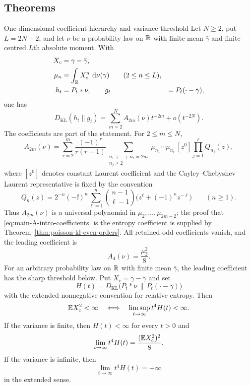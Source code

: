 \subsection*{Theorems}\label{subsec:main-results}

\begin{maintheorem}{One-dimensional coefficient hierarchy and variance threshold}
\label{thm:main-A}
Let \(N\ge2\), put \(L=2N-2\), and let \(\nu\) be a probability law on
\(\mathbb{R}\) with finite mean \(\bar{\gamma}\) and finite centred \(L\)th absolute
moment.  With
\[
\begin{aligned}
  X_c&=\gamma-\bar{\gamma},\\
  \mu_n&=\int_{\mathbb{R}} X_c^n\,\,\mathrm{d}\nu(\gamma)\qquad(2\le n\le L),\\
  h_t&=P_t*\nu,\qquad
  g_t&=P_t(\cdot-\bar{\gamma}),
\end{aligned}
\]
one has
\[
D_{\mathrm{KL}}(h_t\|g_t)
=\sum_{m=2}^{N}A_{2m}(\nu)t^{-2m}+o(t^{-2N}).
\]
The coefficients are part of the statement.  For \(2\le m\le N\),
\begin{equation}\label{eq:main-A-intro-coefficients}
A_{2m}(\nu)=
\sum_{r=2}^{m}
\frac{(-1)^r}{r(r-1)}
\sum_{\substack{n_1+\cdots+n_r=2m\\ n_j\ge2}}
\mu_{n_1}\cdots\mu_{n_r}
\,[z^0]\prod_{j=1}^r Q_{n_j}(z),
\end{equation}
where \([z^0]\) denotes constant Laurent coefficient and the
Cayley--Chebyshev Laurent representative is fixed by the convention
\begin{equation}\label{eq:main-A-intro-Qn}
Q_n(z)=2^{-n}(-\ii)^n
\sum_{\ell=1}^{n}\binom{n-1}{\ell-1}
\bigl(z^\ell+(-1)^nz^{-\ell}\bigr)
\qquad(n\ge1).
\end{equation}
Thus \(A_{2m}(\nu)\) is a universal polynomial in
\(\mu_2,\ldots,\mu_{2m-2}\); the proof that
\eqref{eq:main-A-intro-coefficients} is the entropy coefficient is supplied
by Theorem~\ref{thm:poisson-kl-even-orders}.  All retained odd coefficients
vanish, and the leading coefficient is
\[
A_4(\nu)=\frac{\mu_2^2}{8}.
\]
For an arbitrary probability law on \(\mathbb{R}\) with finite mean
\(\bar{\gamma}\), the leading coefficient has the sharp threshold below.
Put \(X_c=\gamma-\bar{\gamma}\) and set
\[
H(t)=D_{\mathrm{KL}}\bigl(P_t*\nu\,\|\,P_t(\cdot-\bar{\gamma})\bigr)
\]
with the extended nonnegative convention for relative entropy.  Then
\[
\mathbb{E} X_c^2<\infty
\quad\Longleftrightarrow\quad
\limsup_{t\to\infty}t^4H(t)<\infty .
\]
If the variance is finite, then \(H(t)<\infty\) for every \(t>0\) and
\[
\lim_{t\to\infty}t^4H(t)=\frac{(\mathbb{E} X_c^2)^2}{8}.
\]
If the variance is infinite, then
\[
\lim_{t\to\infty}t^4H(t)=+\infty
\]
in the extended sense.
\end{maintheorem}

